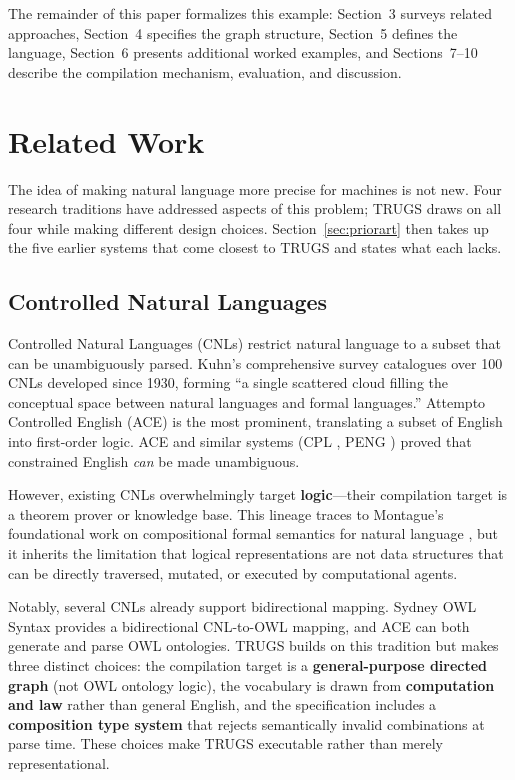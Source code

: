 \documentclass{article}
\begin{document}
The remainder of this paper formalizes this example: Section~3 surveys related approaches, Section~4 specifies the graph structure, Section~5 defines the language, Section~6 presents additional worked examples, and Sections~7--10 describe the compilation mechanism, evaluation, and discussion.

\section{Related Work}

The idea of making natural language more precise for machines is not new. Four research traditions have addressed aspects of this problem; TRUGS draws on all four while making different design choices. Section~\ref{sec:priorart} then takes up the five earlier systems that come closest to TRUGS and states what each lacks.

\subsection{Controlled Natural Languages}

Controlled Natural Languages (CNLs) restrict natural language to a subset that can be unambiguously parsed. Kuhn's comprehensive survey \citep{kuhn2014survey} catalogues over 100 CNLs developed since 1930, forming ``a single scattered cloud filling the conceptual space between natural languages and formal languages.'' Attempto Controlled English (ACE) \citep{fuchs2008attempto} is the most prominent, translating a subset of English into first-order logic. ACE and similar systems (CPL \citep{clark2005class}, PENG \citep{schwitter2002english}) proved that constrained English \textit{can} be made unambiguous.

However, existing CNLs overwhelmingly target \textbf{logic}---their compilation target is a theorem prover or knowledge base. This lineage traces to Montague's foundational work on compositional formal semantics for natural language \citep{montague1973proper}, but it inherits the limitation that logical representations are not data structures that can be directly traversed, mutated, or executed by computational agents.

Notably, several CNLs already support bidirectional mapping. Sydney OWL Syntax \citep{cregan2007sydney} provides a bidirectional CNL-to-OWL mapping, and ACE can both generate and parse OWL ontologies. TRUGS builds on this tradition but makes three distinct choices: the compilation target is a \textbf{general-purpose directed graph} (not OWL ontology logic), the vocabulary is drawn from \textbf{computation and law} rather than general English, and the specification includes a \textbf{composition type system} that rejects semantically invalid combinations at parse time. These choices make TRUGS executable rather than merely representational.
\end{document}
